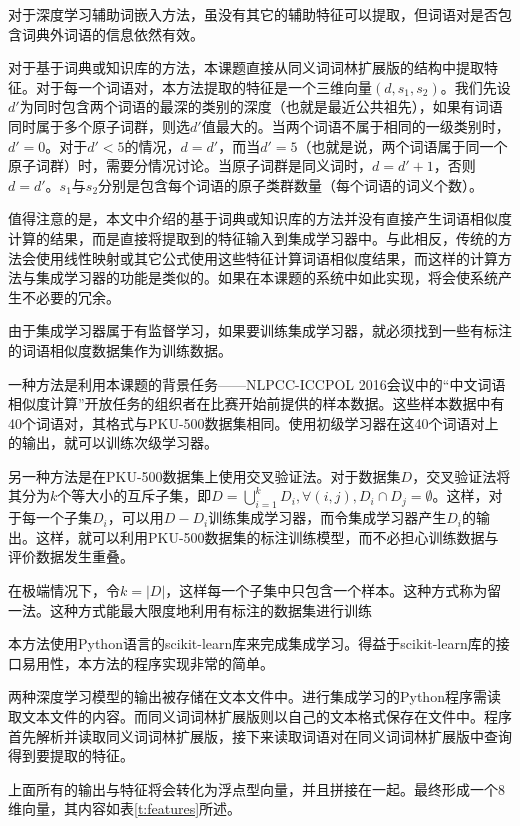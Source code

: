 对于深度学习辅助词嵌入方法，虽没有其它的辅助特征可以提取，但词语对是否包含词典外词语的信息依然有效。

对于基于词典或知识库的方法，本课题直接从同义词词林扩展版的结构中提取特征。对于每一个词语对，本方法提取的特征是一个三维向量$(d, s_1, s_2)$。我们先设$d'$为同时包含两个词语的最深的类别的深度（也就是最近公共祖先），如果有词语同时属于多个原子词群，则选$d'$值最大的。当两个词语不属于相同的一级类别时，$d' = 0$。对于$d' < 5$的情况，$d = d'$，而当$d' = 5$（也就是说，两个词语属于同一个原子词群）时，需要分情况讨论。当原子词群是同义词时，$d = d' + 1$，否则$d = d'$。$s_1$与$s_2$分别是包含每个词语的原子类群数量（每个词语的词义个数）。

值得注意的是，本文中介绍的基于词典或知识库的方法并没有直接产生词语相似度计算的结果，而是直接将提取到的特征输入到集成学习器中。与此相反，传统的方法会使用线性映射或其它公式使用这些特征计算词语相似度结果，而这样的计算方法与集成学习器的功能是类似的。如果在本课题的系统中如此实现，将会使系统产生不必要的冗余。

由于集成学习器属于有监督学习，如果要训练集成学习器，就必须找到一些有标注的词语相似度数据集作为训练数据。

一种方法是利用本课题的背景任务——NLPCC-ICCPOL 2016会议中的“中文词语相似度计算”开放任务的组织者在比赛开始前提供的样本数据。这些样本数据中有40个词语对，其格式与PKU-500数据集相同。使用初级学习器在这40个词语对上的输出，就可以训练次级学习器。

另一种方法是在PKU-500数据集上使用交叉验证法。对于数据集$D$，交叉验证法将其分为$k$个等大小的互斥子集，即$D = \bigcup_{i = 1}^k D_i, \forall (i, j), D_i \cap D_j = \emptyset$。这样，对于每一个子集$D_i$，可以用$D - D_i$训练集成学习器，而令集成学习器产生$D_i$的输出。这样，就可以利用PKU-500数据集的标注训练模型，而不必担心训练数据与评价数据发生重叠。

在极端情况下，令$k = |D|$，这样每一个子集中只包含一个样本。这种方式称为留一法。这种方式能最大限度地利用有标注的数据集进行训练

本方法使用Python语言的scikit-learn库来完成集成学习。得益于scikit-learn库的接口易用性，本方法的程序实现非常的简单。

两种深度学习模型的输出被存储在文本文件中。进行集成学习的Python程序需读取文本文件的内容。而同义词词林扩展版则以自己的文本格式保存在文件中。程序首先解析并读取同义词词林扩展版，接下来读取词语对在同义词词林扩展版中查询得到要提取的特征。

上面所有的输出与特征将会转化为浮点型向量，并且拼接在一起。最终形成一个8维向量，其内容如表\ref{t:features}所述。


